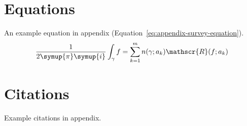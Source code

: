 \begin{survey}
  \section{Equations}

  An example equation in appendix (Equation~\eqref{eq:appendix-survey-equation}).
  \begin{equation}
    \frac{1}{2 \symup{\pi} \symup{i}} \int_\gamma f = \sum_{k=1}^m n(\gamma; a_k) \mathscr{R}(f; a_k)
    \label{eq:appendix-survey-equation}
  \end{equation}


  \section{Citations}

  Example citations in appendix.
  \cite{abrahams99tex}
  \cite{salomon1995advanced}
  \cite{abrahams99tex,salomon1995advanced}


  
  

\end{survey}
